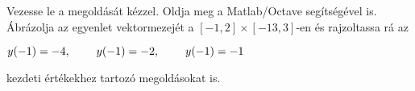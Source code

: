 Vezesse le a 
\de{} megoldását kézzel. 
Oldja meg a Matlab/Octave   segítségével is. 
Ábrázolja az egyenlet vektormezejét a $[-1,2]\times [-13,3]$-en és rajzoltassa rá 
az 
\centerline{$y(-1)=-4, \hspace{0.8cm} y(-1)=-2, \hspace{0.8cm} y(-1)=-1$} 
kezdeti értékekhez tartozó megoldásokat is.


